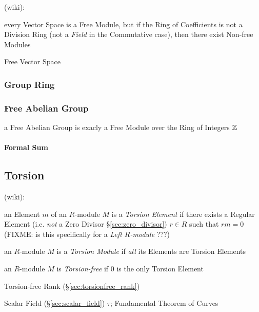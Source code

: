 (wiki):

every Vector Space is a Free Module, but if the Ring of Coefficients is not a
Division Ring (not a \emph{Field} in the Commutative case), then there exist
Non-free Modules

Free Vector Space



\subsubsection{Group Ring}\label{sec:group_ring}

\subsubsection{Free Abelian Group}\label{sec:free_commutative_group}

a Free Abelian Group is exacly a Free Module over the Ring of Integers $\mathbb{Z}$



\paragraph{Formal Sum}\label{sec:formal_sum}\hfill



\subsection{Torsion}\label{sec:torsion}

(wiki):

an Element $m$ of an $R$-module $M$ is a \emph{Torsion Element} if there exists
a Regular Element (i.e. \emph{not} a Zero Divisor \S\ref{sec:zero_divisor})
$r \in R$ such that $r m = 0$
(FIXME: is this specifically for a \emph{Left $R$-module} ???)

an $R$-module $M$ is a \emph{Torsion Module} if \emph{all} its Elements are
Torsion Elements

an $R$-module $M$ is \emph{Torsion-free} if $0$ is the only Torsion Element

Torsion-free Rank (\S\ref{sec:torsionfree_rank})

Scalar Field (\S\ref{sec:scalar_field}) $\tau$; Fundamental Theorem of Curves



